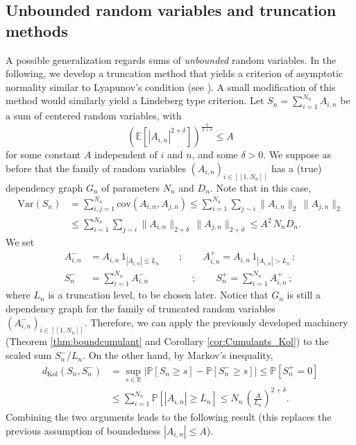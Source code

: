 \documentclass[envcountsame]{svmult}
\newcommand{\R}{\mathbb{R}}
\newcommand{\esper}{\mathbb{E}}
\newcommand{\proba}{\mathbb{P}}
\newcommand{\dkol}{d_\mathrm{Kol}}
\newcommand{\var}{\mathrm{Var}}
\newcommand{\lle}{\left[\!\left[}
\newcommand{\rre}{\right]\!\right]}
\begin{document}
\subsection{Unbounded random variables and truncation methods}
A possible generalization regards sums of \emph{unbounded} random variables.
In the following, we develop a truncation method that yields a criterion of asymptotic normality similar to Lyapunov's condition (see \cite[Chapter 27]{Bil95}). A small modification of this method would similarly yield a Lindeberg type criterion. Let $S_n = \sum_{i=1}^{N_n} A_{i,n}$ be a sum of centered random variables, with 
$$\left(\esper[|A_{i,n}|^{2+\delta}]\right)^{\frac{1}{2+\delta}} \leq A$$
for some constant $A$ independent of $i$ and $n$, and some $\delta>0$. We suppose as before that the family of random variables $(A_{i,n})_{i\in \lle 1,N_n\rre}$ has a (true) dependency graph $G_n$ of parameters $N_n$ and $D_n$. Note that in this case, 
\begin{align*}
\var(S_n) &= \sum_{i,j=1}^{N_n} \mathrm{cov}(A_{i,n},A_{j,n}) \leq \sum_{i=1}^{N_n} \sum_{j \sim i} \|A_{i,n}\|_2\,\|A_{j,n}\|_2 \\
&\leq \sum_{i=1}^{N_n} \sum_{j \sim i} \|A_{i,n}\|_{2+\delta}\,\|A_{j,n}\|_{2+\delta} \leq A^2 \,N_n D_n.
\end{align*}
We set
\begin{align*}
A_{i,n}^- &= A_{i,n}\,1_{|A_{i,n}| \leq L_n} \qquad;\qquad A_{i,n}^+ = A_{i,n}\,1_{|A_{i,n}| > L_n}\,; \\
S_n^- &=\sum_{i=1}^{N_n} A_{i,n}^- \qquad\qquad\,\,\,;\qquad S_n^+=\sum_{i=1}^{N_n} A_{i,n}^+\,;
\end{align*}
where $L_n$ is a truncation level, to be chosen later. Notice that $G_n$ is still a dependency graph for the family of truncated random variables $(A_{i,n}^-)_{i \in \lle 1,N_n\rre}$. Therefore, we can apply the previously developed machinery
(Theorem \ref{thm:boundcumulant} and Corollary \ref{cor:Cumulants_Kol})
to the scaled sum $S_n^-/L_n$. On the other hand, by Markov's inequality,
\begin{align*}
\dkol(S_n,S_n^-) &= \sup_{s \in \R} |\proba[S_n \geq s] - \proba[S_n^- \geq s]| \leq \proba[S_n^+ = 0] \\
&\leq \sum_{i=1}^{N_n} \proba[|A_{i,n}| \geq L_n] \leq N_n\,\left(\frac{A}{L_n}\right)^{\!\!2+\delta}.
\end{align*}
Combining the two arguments leads to the following result
(this replaces the previous assumption of boundedness $|A_{i,n}| \leq A$). 
\end{document}
